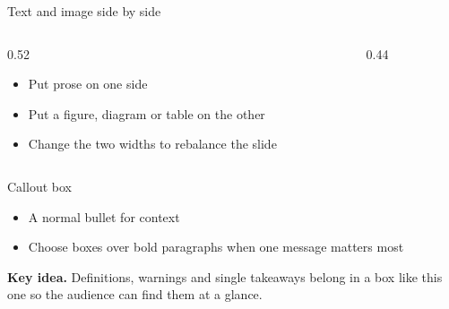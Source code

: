 \begin{frame}{Text and image side by side}
    \begin{columns}[T, onlytextwidth]
        \begin{column}{0.52\textwidth}
            \begin{itemize}
                \item Put prose on one side
                \item Put a figure, diagram or table on the other
                \item Change the two widths to rebalance the slide
            \end{itemize}
        \end{column}

        \begin{column}{0.44\textwidth}
            \centering
        \end{column}
    \end{columns}
\end{frame}

\begin{frame}{Callout box}
    \begin{itemize}
        \item A normal bullet for context
        \item Choose boxes over bold paragraphs when one message matters most
    \end{itemize}

    \vspace{0.3cm}

    \begin{tcolorbox}[colback=BrandPrimary!8, colframe=BrandPrimary,
                      boxrule=0.6pt, arc=3pt, left=6pt, right=6pt]
        \textbf{Key idea.} Definitions, warnings and single takeaways belong in
        a box like this one so the audience can find them at a glance.
    \end{tcolorbox}
\end{frame}
